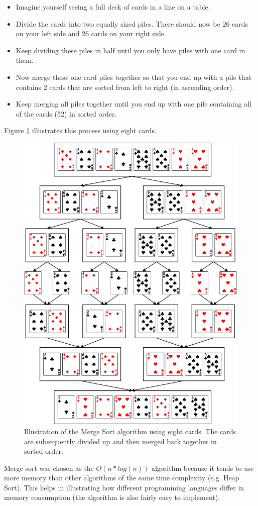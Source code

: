 \begin{itemize}
\item Imagine yourself seeing a full deck of cards in a line on a table.
\item Divide the cards into two equally sized piles. There should now be 26 cards on your left side and 26 cards on your right side.
\item Keep dividing these piles in half until you only have piles with one card in them. 
\item Now merge these one card piles together so that you end up with a pile that contains 2 cards that are sorted from left to right (in ascending order).
\item Keep merging all piles together until you end up with one pile containing all of the cards (52) in sorted order.

\end{itemize} 

Figure \ref{fig:mergesort} illustrates this process using eight cards.

\begin{figure}[h]
	\centering
	\includegraphics[width=0.9\linewidth]{chapters/media/mergesort4.png}
	\caption{Illustration of the Merge Sort algorithm using eight cards. The cards are subsequently divided up and then merged back together in sorted order.}
	\label{fig:mergesort}
\end{figure}

Merge sort was chosen as the $O(n * log(n))$ algorithm because it tends to use more memory than other algorithms of the same time complexity \cite{Mergesort} (e.g. Heap Sort). This helps in illustrating how different programming languages differ in memory consumption (the algorithm is also fairly easy to implement). 





